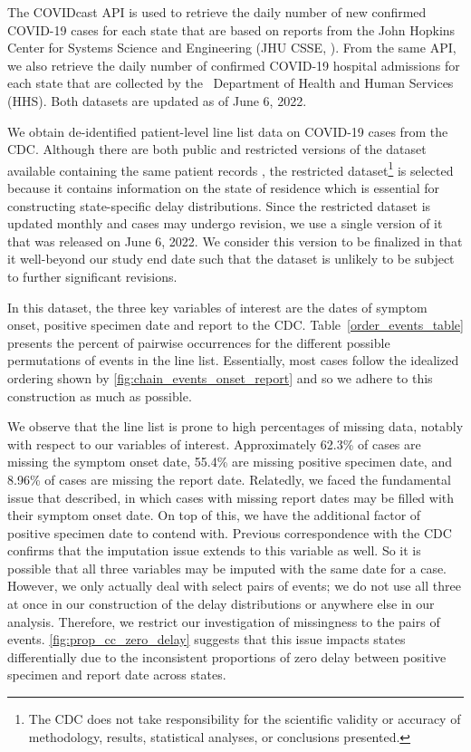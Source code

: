\documentclass{article}
\begin{document}
The COVIDcast API \citep{reinhart2021open} is used to retrieve the daily number
of new confirmed COVID-19 cases for each state that are based on reports from
the John Hopkins Center for Systems Science and Engineering (JHU CSSE,
\citealp{dong2020interactive}). From the same API, we also retrieve the daily
number of confirmed COVID-19 hospital admissions for each state that are
collected by the \US\ Department of Health and Human Services (HHS). Both
datasets are updated as of June 6, 2022.

We obtain de-identified patient-level line list data on COVID-19 cases from the
CDC. Although there are both public and restricted versions of the dataset
available containing the same patient records \citep{cdc2020casepub,
cdc2020caserestr}, the restricted dataset\footnote{The CDC does not take
responsibility for the scientific validity or accuracy of methodology, results,
statistical analyses, or conclusions presented.} is selected because it contains
information on the state of residence which is essential for constructing
state-specific delay distributions. Since the restricted dataset is updated
monthly and cases may undergo revision, we use a single version of it that was
released on June 6, 2022. We consider this version to be finalized in that it
well-beyond our study end date such that the dataset is unlikely to be subject
to further significant revisions.

In this dataset, the three key variables of interest are the dates of symptom
onset, positive specimen date and report to the CDC. 
Table~\ref{order_events_table} presents the percent of pairwise occurrences
 for the different possible permutations of events in the line list. 
Essentially, most cases follow the idealized ordering shown by
 \autoref{fig:chain_events_onset_report} and so we adhere to this construction 
 as much as possible. 

We observe that the line list is prone to
high percentages of missing data, notably with respect to our variables of
interest. Approximately 62.3\% of cases are missing the symptom onset 
date, 55.4\% are missing positive specimen date, and 8.96\% of cases 
are missing the report date. Relatedly, we faced the
fundamental issue that \citet{jahja2022real} described, in which cases with
missing report dates may be filled with their symptom onset date. On top of this, 
we have the additional factor
of positive specimen date to contend with. Previous correspondence with the 
CDC confirms that the imputation issue
extends to this variable as well. So it is possible that all three variables may be
 imputed with the same date for a case.
However, we only actually deal with select pairs of events; 
we do not use all three at once
in our construction of the delay distributions or anywhere else in our analysis.
Therefore, we restrict our investigation of missingness to the pairs of events. 
\autoref{fig:prop_cc_zero_delay} suggests that this issue impacts states differentially
due to the inconsistent proportions of zero delay between positive specimen and 
report date across states. 
\end{document}
